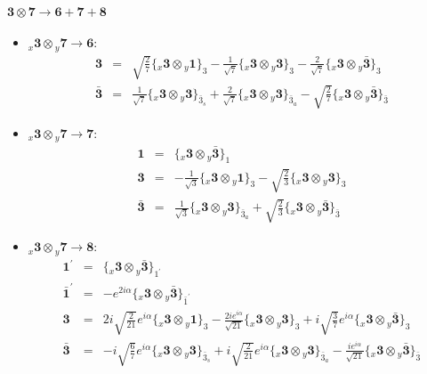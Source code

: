 \documentclass[english]{article}
\newcommand{\rep}[1]{\mathbf{#1}}
\newcommand{\repx}[2]{{}_{#2}\mathbf{#1}}
\newcommand{\subcg}[3]{\big\{ \repx{#1}{x}\otimes\repx{#2}{y}\big\}^{}_{#3}}
\begin{document}
\paragraph*{\Large $\rep{3}\otimes\rep{7}\to\rep{6}+\rep{7}+\rep{8}$}
\begin{itemize}
\item $\repx{3}{x}\otimes\repx{7}{y}\to\rep{6}$:
\begin{eqnarray*}
\rep{3} &=& \sqrt{\frac{2}{7}}\subcg{3}{1}{3}-\frac{1}{\sqrt{7}}\subcg{3}{3}{3}-\frac{2}{\sqrt{7}}\subcg{3}{\bar{3}}{3}
\\
\rep{\bar{3}} &=& \frac{1}{\sqrt{7}}\subcg{3}{3}{\bar{3}_{s}}+\frac{2}{\sqrt{7}}\subcg{3}{3}{\bar{3}_{a}}-\sqrt{\frac{2}{7}}\subcg{3}{\bar{3}}{\bar{3}}
\end{eqnarray*}
\item $\repx{3}{x}\otimes\repx{7}{y}\to\rep{7}$:
\begin{eqnarray*}
\rep{1} &=& \subcg{3}{\bar{3}}{1}
\\
\rep{3} &=& -\frac{1}{\sqrt{3}}\subcg{3}{1}{3}-\sqrt{\frac{2}{3}}\subcg{3}{3}{3}
\\
\rep{\bar{3}} &=& \frac{1}{\sqrt{3}}\subcg{3}{3}{\bar{3}_{a}}+\sqrt{\frac{2}{3}}\subcg{3}{\bar{3}}{\bar{3}}
\end{eqnarray*}
\item $\repx{3}{x}\otimes\repx{7}{y}\to\rep{8}$:
\begin{eqnarray*}
\rep{1^{\prime}} &=& \subcg{3}{\bar{3}}{1^{\prime}}
\\
\rep{\bar{1}^{\prime}} &=& -e^{2 i \alpha }\subcg{3}{\bar{3}}{\bar{1}^{\prime}}
\\
\rep{3} &=& 2 i \sqrt{\frac{2}{21}} e^{i \alpha }\subcg{3}{1}{3}-\frac{2 i e^{i \alpha }}{\sqrt{21}}\subcg{3}{3}{3}+i \sqrt{\frac{3}{7}} e^{i \alpha }\subcg{3}{\bar{3}}{3}
\\
\rep{\bar{3}} &=& -i \sqrt{\frac{6}{7}} e^{i \alpha }\subcg{3}{3}{\bar{3}_{s}}+i \sqrt{\frac{2}{21}} e^{i \alpha }\subcg{3}{3}{\bar{3}_{a}}-\frac{i e^{i \alpha }}{\sqrt{21}}\subcg{3}{\bar{3}}{\bar{3}}
\end{eqnarray*}
\end{itemize}
\end{document}
